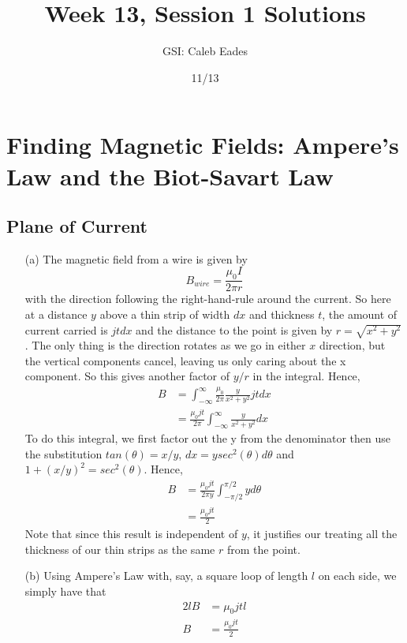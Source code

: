 \documentclass{article}
\begin{document}
\title{Week 13, Session 1 Solutions}
\author{GSI: Caleb Eades}
\date{11/13}
\maketitle

\section{Finding Magnetic Fields: Ampere's Law and the Biot-Savart Law}

\subsection{Plane of Current}

\begin{itemize}
\item[(a)] The magnetic field from a wire is given by
\begin{equation}
B_{wire} = \frac{\mu_0 I}{2\pi r}
\end{equation}
with the direction following the right-hand-rule around the current. So here at a distance $y$ above a thin strip of width $dx$ and thickness $t$, the amount of current carried is $jtdx$ and the distance to the point is given by $r = \sqrt{x^2+y^2}$. The only thing is the direction rotates as we go in either $x$ direction, but the vertical components cancel, leaving us only caring about the x component. So this gives another factor of $y/r$ in the integral. Hence,
\begin{align*}
B &= \int_{-\infty}^{\infty}\frac{\mu_0}{2\pi}\frac{y}{x^2+y^2}jtdx \\
&= \frac{\mu_0 jt}{2\pi}\int_{-\infty}^{\infty}\frac{y}{x^2+y^2}dx
\end{align*}
To do this integral, we first factor out the y from the denominator then use the substitution $tan(\theta) = x/y$, $dx = ysec^2(\theta)d\theta$ and $1+(x/y)^2 = sec^2(\theta)$. Hence,
\begin{align*}
B &= \frac{\mu_0 jt}{2\pi y}\int_{-\pi/2}^{\pi/2}yd\theta \\
&= \frac{\mu_0 jt}{2}
\end{align*}
Note that since this result is independent of $y$, it justifies our treating all the thickness of our thin strips as the same $r$ from the point.
\item[(b)] Using Ampere's Law with, say, a square loop of length $l$ on each side, we simply have that
\begin{align*}
2lB &= \mu_0 jtl \\
B &= \frac{\mu_0 jt}{2}
\end{align*}
\end{itemize}
\end{document}
